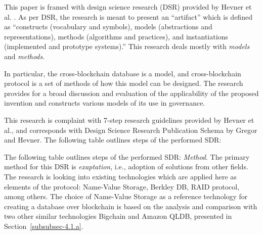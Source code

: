 \begin{multicols}{2}
This paper is framed with design science research (DSR) provided by Hevner et al. \cite{art1-key02}. As per DSR, the research is meant to present an “artifact” which is defined as “constructs (vocabulary and symbols), models (abstractions and representations), methods (algorithms and practices), and instantiations (implemented and prototype systems).” This research deals mostly with \textit{models} and \textit{methods}.

In particular, the cross-blockchain database is a model, and cross-blockchain protocol is a set of methods of how this model can be designed. The research provides for a broad discussion and evaluation of the applicability of the proposed invention and constructs various models of its use in governance.

This research is complaint with 7-step research guidelines provided by Hevner et al., and corresponds with Design Science Research Publication Schema \cite{art1-key03} by Gregor and Hevner. The following table outlines steps of the performed SDR:

The following table outlines steps of the performed SDR: \textit{Method}. The primary method for this DSR is \textit{exaptation}, i.e., adoption of solutions from other fields. The research is looking into existing technologies which are applied here as elements of the protocol: Name-Value Storage, Berkley DB, RAID protocol, among others. The choice of Name-Value Storage as a reference technology for creating a database over blockchain is based on the analysis and comparison with two other similar technologies Bigchain and Amazon QLDB, presented in Section~\ref{subsubsec-4.1.a}.
\end{multicols}
